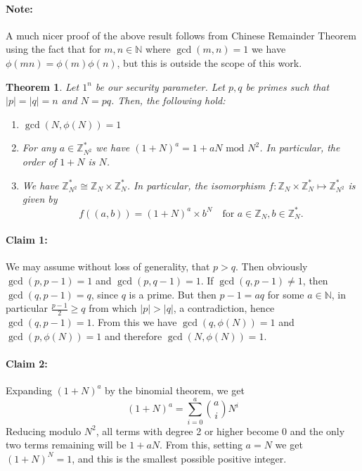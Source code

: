 \documentclass{article}
\newtheorem{theorem}{Theorem}[section]
\theoremstyle{definition}
\newcommand{\Int}{\mathbb{Z}}
\newcommand{\Nat}{\mathbb{N}}
\renewcommand{\mod}{\,\,\text{mod}\,\,}
\begin{document}
\paragraph{Note:} A much nicer proof of the above result follows from Chinese
Remainder Theorem using the fact that for $m, n \in \Nat$ where $\gcd(m, n) = 1$
we have $\phi(mn) = \phi(m)\phi(n)$, but this is outside the scope of this work. 
\begin{theorem}
  \label{thm:paillierthms}
Let $1^n$ be our security parameter. Let $p, q$ be primes such that
$|p| = |q| = n$ and $N = pq$. Then, the following hold:
\begin{enumerate}
\item $\gcd(N, \phi(N)) = 1$
\item For any $a \in \Int_{N^2}^*$ we have $(1 + N)^a = 1 + aN \mod N^2$. In
  particular, the order of $1 + N$ is $N$.
\item We have $\Int_{N^2}^* \cong \Int_{N} \times \Int_{N}^*$.
In particular, the isomorphism $f:\Int_{N} \times \Int_{N}^* \mapsto \Int_{N^2}^*$
is given by
\[
   f((a, b)) = (1 + N)^a \times b^N \quad\text{for}\,\, a \in \Int_{N}, b \in \Int_{N}^*.
\]
\end{enumerate}  
\end{theorem}
\paragraph{Claim 1:} We may assume without loss of generality, that $p > q$.
Then obviously $\gcd(p, p - 1) = 1$ and $\gcd(p, q - 1) = 1$. If $\gcd(q, p - 1)
\neq 1$, then $\gcd(q, p - 1) = q$, since $q$ is a prime. But then $p - 1 = aq$
for some $a \in \Nat$, in particular $\frac{p - 1}{2} \geq q$ from which $|p| >
|q|$, a contradiction, hence $\gcd(q, p - 1) = 1$. From this we have $\gcd(q,
\phi(N)) = 1$ and $\gcd(p, \phi(N)) = 1$ and therefore $\gcd(N, \phi(N)) = 1$.
\paragraph{Claim 2:} Expanding $(1 + N)^a$ by the binomial theorem, we get
\[
  (1 + N)^a = \sum_{i =0}^a \binom{a}{i} N^i
\]
Reducing modulo $N^2$, all terms with degree 2 or higher become 0 and the only
two terms remaining will be $1 + aN$. From this, setting $a = N$ we get $(1 +
N)^N = 1$, and this is the smallest possible positive integer.
\end{document}
